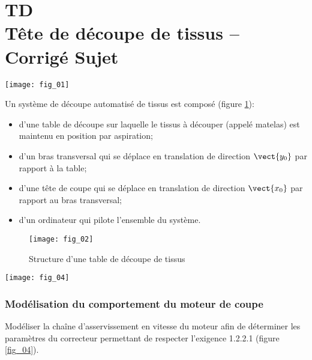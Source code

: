 \chapter*{TD  \\ 
Tête de découpe de tissus -- \ifprof Corrigé \else Sujet \fi}


\iflivret {} \else
\ifprof  {} \else \fi
\fi
\setcounter{question}{0}

\begin{marginfigure}
\centering
\texttt{[image: fig\_01]}
\end{marginfigure}

\ifprof
\else
Un système de découpe automatisé de tissus est composé (figure \ref{fig_02}):
\begin{itemize}
\item d’une table de découpe sur laquelle le tissus à découper (appelé matelas) est maintenu en position
par aspiration;
\item d’un bras transversal qui se déplace en translation de direction $\vect{y_0}$ par rapport à la table;
\item d’une tête de coupe qui se déplace en translation de direction $\vect{x_0}$ par rapport au bras transversal;
\item d’un ordinateur qui pilote l’ensemble du système.
\end{itemize}


\begin{figure}[!h]
\centering
\texttt{[image: fig\_02]}
\caption{Structure d’une table de découpe de tissus}
\label{fig_02}
\end{figure}

\fi

\begin{marginfigure}
\centering
\texttt{[image: fig\_04]}
\caption{Exigence 1.2.2.1}
\label{fig_04}
\end{marginfigure}


\subsection*{Modélisation du comportement du moteur de coupe}

\begin{obj} 
Modéliser la chaîne d’asservissement en vitesse du moteur afin de déterminer les paramètres du correcteur permettant de respecter l’exigence 1.2.2.1 (figure \ref{fig_04}).
\end{obj}

